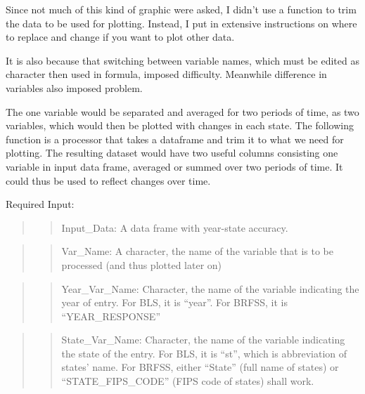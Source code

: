 \documentclass[
]{article}
\begin{document}
Since not much of this kind of graphic were asked, I didn't use a
function to trim the data to be used for plotting. Instead, I put in
extensive instructions on where to replace and change if you want to
plot other data.

It is also because that switching between variable names, which must be
edited as character then used in formula, imposed difficulty. Meanwhile
difference in variables also imposed problem.

The one variable would be separated and averaged for two periods of
time, as two variables, which would then be plotted with changes in each
state. The following function is a processor that takes a dataframe and
trim it to what we need for plotting. The resulting dataset would have
two useful columns consisting one variable in input data frame, averaged
or summed over two periods of time. It could thus be used to reflect
changes over time.

Required Input:

\begin{quote}
\begin{quote}
Input\_Data: A data frame with year-state accuracy.
\end{quote}
\end{quote}

\begin{quote}
\begin{quote}
Var\_Name: A character, the name of the variable that is to be processed
(and thus plotted later on)
\end{quote}
\end{quote}

\begin{quote}
\begin{quote}
Year\_Var\_Name: Character, the name of the variable indicating the year
of entry. For BLS, it is ``year''. For BRFSS, it is ``YEAR\_RESPONSE''
\end{quote}
\end{quote}

\begin{quote}
\begin{quote}
State\_Var\_Name: Character, the name of the variable indicating the
state of the entry. For BLS, it is ``st'', which is abbreviation of
states' name. For BRFSS, either ``State'' (full name of states) or
``STATE\_FIPS\_CODE'' (FIPS code of states) shall work.
\end{quote}
\end{quote}
\end{document}

